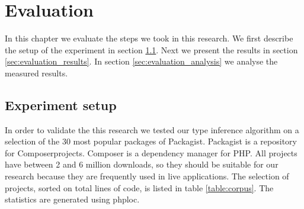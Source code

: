 \documentclass[../main.tex]{subfiles}
\begin{document}
    \chapter{Evaluation}\label{ch:evaluation}
	In this chapter we evaluate the steps we took in this research.
	We first describe the setup of the experiment in section \ref{sec:evaluation_experiment_setup}.
	Next we present the results in section \ref{sec:evaluation_results}.
	In section \ref{sec:evaluation_analysis} we analyse the measured results.
	
	\section{Experiment setup}\label{sec:evaluation_experiment_setup}
	
	In order to validate the this research we tested our type inference algorithm on a selection of the 30 most popular packages of Packagist\footnotemark.
	Packagist is a repository for Composer\footnotemark projects.
	Composer is a dependency manager for PHP.
	All projects have between 2 and 6 million downloads, so they should be suitable for our research because they are frequently used in live applications.
	The selection of projects, sorted on total lines of code, is listed in table \ref{table:corpus}.
	The statistics are generated using phploc\footnotemark.
\end{document}
